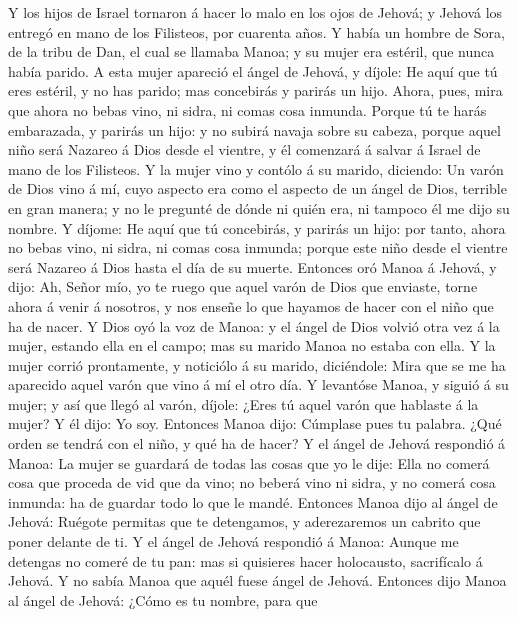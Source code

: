  Y los hijos de Israel tornaron á hacer lo malo en los ojos
de Jehová; y Jehová los entregó en mano de los Filisteos, por cuarenta
años.  Y había un hombre de Sora, de la tribu de Dan, el
cual se llamaba Manoa; y su mujer era estéril, que nunca había parido.
 A esta mujer apareció el ángel de Jehová, y díjole: He aquí
que tú eres estéril, y no has parido; mas concebirás y parirás un hijo.
 Ahora, pues, mira que ahora no bebas vino, ni sidra, ni
comas cosa inmunda.  Porque tú te harás embarazada, y
parirás un hijo: y no subirá navaja sobre su cabeza, porque aquel niño
será Nazareo á Dios desde el vientre, y él comenzará á salvar á Israel
de mano de los Filisteos.  Y la mujer vino y contólo á su
marido, diciendo: Un varón de Dios vino á mí, cuyo aspecto era como el
aspecto de un ángel de Dios, terrible en gran manera; y no le pregunté
de dónde ni quién era, ni tampoco él me dijo su nombre.  Y
díjome: He aquí que tú concebirás, y parirás un hijo: por tanto, ahora
no bebas vino, ni sidra, ni comas cosa inmunda; porque este niño desde
el vientre será Nazareo á Dios hasta el día de su muerte. 
Entonces oró Manoa á Jehová, y dijo: Ah, Señor mío, yo te ruego que
aquel varón de Dios que enviaste, torne ahora á venir á nosotros, y nos
enseñe lo que hayamos de hacer con el niño que ha de nacer. 
Y Dios oyó la voz de Manoa: y el ángel de Dios volvió otra vez á la
mujer, estando ella en el campo; mas su marido Manoa no estaba con ella.
 Y la mujer corrió prontamente, y noticiólo á su marido,
diciéndole: Mira que se me ha aparecido aquel varón que vino á mí el
otro día.  Y levantóse Manoa, y siguió á su mujer; y así
que llegó al varón, díjole: ¿Eres tú aquel varón que hablaste á la
mujer? Y él dijo: Yo soy.  Entonces Manoa dijo: Cúmplase
pues tu palabra. ¿Qué orden se tendrá con el niño, y qué ha de hacer?
 Y el ángel de Jehová respondió á Manoa: La mujer se
guardará de todas las cosas que yo le dije:  Ella no comerá
cosa que proceda de vid que da vino; no beberá vino ni sidra, y no
comerá cosa inmunda: ha de guardar todo lo que le mandé. 
Entonces Manoa dijo al ángel de Jehová: Ruégote permitas que te
detengamos, y aderezaremos un cabrito que poner delante de ti.
 Y el ángel de Jehová respondió á Manoa: Aunque me detengas
no comeré de tu pan: mas si quisieres hacer holocausto, sacrifícalo á
Jehová. Y no sabía Manoa que aquél fuese ángel de Jehová. 
Entonces dijo Manoa al ángel de Jehová: ¿Cómo es tu nombre, para que
